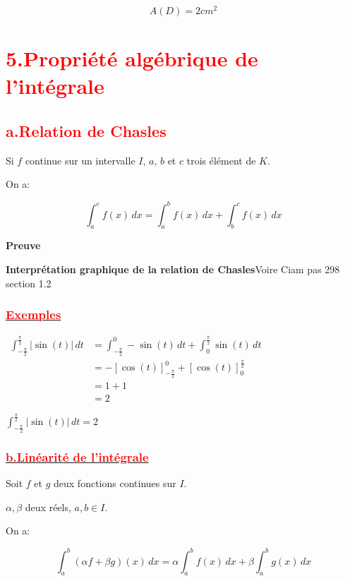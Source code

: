 \documentclass[12pt]{article}
\begin{document}
\[\boxed{A(D)=2cm^{2}}\]   

\section*{\textbf{\textcolor{red}{5.Propriété algébrique de l'intégrale}}}
\subsection*{\textbf{\textcolor{red}{a.Relation de Chasles}}}

Si  \( f \) continue sur un intervalle  \( I \), $a$, $b$ et $c$ trois élément de $K$.

On a:

\[
\int_a^c f(x) \, dx = \int_a^b f(x) \, dx + \int_b^c f(x) \, dx
\]


\textbf{Preuve}

\textbf{Interprétation graphique de la relation de Chasles}Voire Ciam pas 298 section 1.2  

\subsubsection*{\underline{\textbf{\textcolor{red}{Exemples}}}}

\(
\begin{aligned}
\int_{-\frac{\pi}{2}}^{\frac{\pi}{2}} \left| \sin(t) \right| \, dt &= \int_{-\frac{\pi}{2}}^{0} -\sin(t) \, dt + \int_{0}^{\frac{\pi}{2}} \sin(t) \, dt\\
&= -\left[\cos(t) \right]_{-\frac{\pi}{2}}^{0} + \left[ \cos(t) \right]_{0}^{\frac{\pi}{2}}\\
&=1+1\\
&=2
\end{aligned}
\)

\( \int_{-\frac{\pi}{2}}^{\frac{\pi}{2}} \left| \sin(t) \right| \, dt = 2 \)

\subsubsection*{\underline{\textbf{\textcolor{red}{b.Linéarité de l'intégrale}}}}

Soit \( f \) et \( g \) deux fonctions continues sur \( I \). 

\( \alpha, \beta \) deux réels,  \( a, b \in I \).

On a:

\[
\boxed{\int_a^b \left( \alpha f + \beta g \right)(x) \, dx = \alpha \int_a^b f(x) \, dx + \beta \int_a^b g(x) \, dx}
\]
\end{document}
